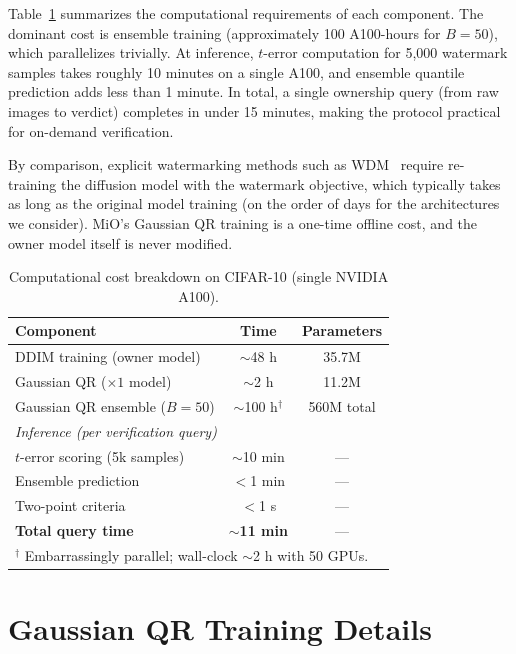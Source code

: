 \documentclass{article}
\begin{document}
Table~\ref{tab:cost} summarizes the computational requirements of each component. The dominant cost is ensemble training (approximately 100 A100-hours for $B = 50$), which parallelizes trivially. At inference, $t$-error computation for 5{,}000 watermark samples takes roughly 10 minutes on a single A100, and ensemble quantile prediction adds less than 1 minute. In total, a single ownership query (from raw images to verdict) completes in under 15 minutes, making the protocol practical for on-demand verification.

By comparison, explicit watermarking methods such as WDM~\citep{peng2023watermark} require re-training the diffusion model with the watermark objective, which typically takes as long as the original model training (on the order of days for the architectures we consider). MiO's Gaussian QR training is a one-time offline cost, and the owner model itself is never modified.

\begin{table}[!htbp]
\caption{Computational cost breakdown on CIFAR-10 (single NVIDIA A100).}
\label{tab:cost}
\centering
\begin{small}
\begin{tabular}{lcc}
\toprule
Component & Time & Parameters \\
\midrule
DDIM training (owner model) & $\sim$48 h & 35.7M \\
Gaussian QR ($\times 1$ model) & $\sim$2 h & 11.2M \\
Gaussian QR ensemble ($B{=}50$) & $\sim$100 h$^\dagger$ & 560M total \\
\midrule
\multicolumn{3}{l}{\textit{Inference (per verification query)}} \\
$t$-error scoring (5k samples) & $\sim$10 min & --- \\
Ensemble prediction & $<$1 min & --- \\
Two-point criteria & $<$1 s & --- \\
\midrule
\textbf{Total query time} & \textbf{$\sim$11 min} & --- \\
\bottomrule
\multicolumn{3}{l}{\footnotesize $^\dagger$ Embarrassingly parallel; wall-clock $\sim$2 h with 50 GPUs.} \\
\end{tabular}
\end{small}
\end{table}


\section{Gaussian QR Training Details}
\label{app:training}
\end{document}
